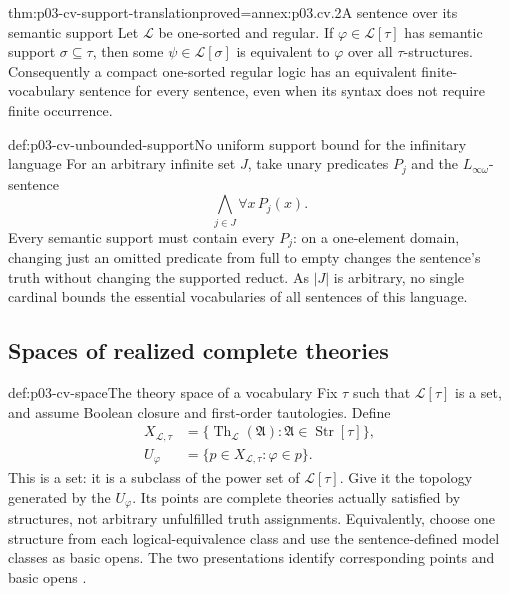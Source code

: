 \begin{hbcorollary}{thm:p03-cv-support-translation}{proved=annex:p03.cv.2}{A sentence over its semantic support}
Let \(\mathscr L\) be one-sorted and regular. If
\(\varphi\in\mathscr L[\tau]\) has semantic support
\(\sigma\subseteq\tau\), then some
\(\psi\in\mathscr L[\sigma]\) is equivalent to \(\varphi\)
over all \(\tau\)-structures. Consequently a compact one-sorted
regular logic has an equivalent finite-vocabulary sentence for every
sentence, even when its syntax does not require finite occurrence.
\end{hbcorollary}

\begin{hbexample}{def:p03-cv-unbounded-support}{No uniform support bound for the infinitary language}
For an arbitrary infinite set \(J\), take unary predicates \(P_j\)
and the \(L_{\infty\omega}\)-sentence
\[
 \bigwedge_{j\in J}\forall x\,P_j(x).
\]
Every semantic support must contain every \(P_j\): on a one-element
domain, changing just an omitted predicate from full to empty changes
the sentence's truth without changing the supported reduct.
As \(|J|\) is arbitrary, no single cardinal bounds the essential
vocabularies of all sentences of this language.
\end{hbexample}

\subsection{Spaces of realized complete theories}

\begin{hbdefinition}{def:p03-cv-space}{The theory space of a vocabulary}
Fix \(\tau\) such that \(\mathscr L[\tau]\) is a set, and assume
Boolean closure and first-order tautologies. Define
\[
 \begin{aligned}
 X_{\mathscr L,\tau}
   &=\{\operatorname{Th}_{\mathscr L}(\mathfrak A):
                    \mathfrak A\in\operatorname{Str}[\tau]\},\\
 U_\varphi&=\{p\in X_{\mathscr L,\tau}:\varphi\in p\}.
 \end{aligned}
\]
This is a set: it is a subclass of the power set of
\(\mathscr L[\tau]\). Give it the topology generated by the
\(U_\varphi\). Its points are complete theories actually satisfied
by structures, not arbitrary unfulfilled truth assignments.
Equivalently, choose one structure from each logical-equivalence
class and use the sentence-defined model classes as basic opens.
The two presentations identify corresponding points and basic opens
\cite[Ch.~II, \S5.1, p.~59]{Ebbinghaus1985ExtendedLogics}.
\end{hbdefinition}

